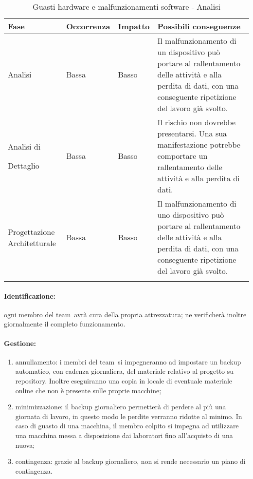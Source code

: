 \documentclass[../PianoProgetto.tex]{subfiles}
\begin{document}
	\begin{table}[h]
		\centering
		\begin{tabularx}{\textwidth}{F O O P}
			\toprule
			\textbf{Fase} & \textbf{Occorrenza} & \textbf{Impatto} & \textbf{Possibili conseguenze}\\
			\midrule
			Analisi & Bassa & Basso & Il malfunzionamento di un dispositivo può portare al rallentamento delle attività e alla perdita di dati, con una conseguente ripetizione del lavoro già svolto. \\
			\midrule
			Analisi di \par Dettaglio & Bassa & Basso & Il rischio non dovrebbe presentarsi. Una sua manifestazione potrebbe comportare un rallentamento delle attività e alla perdita di dati. \\
			\midrule
			Progettazione Architetturale & Bassa & Basso & Il malfunzionamento di uno dispositivo può portare al rallentamento delle attività e alla perdita di dati, con una conseguente ripetizione del lavoro già svolto. \\
			\bottomrule
		\end{tabularx}
		\caption{Guasti hardware e malfunzionamenti software - Analisi}
		\label{tab:Guasti hardware e malfunzionamenti software - Analisi}	
	\end{table} 
		
	\paragraph*{Identificazione:} ogni membro del team\g\ avrà cura della propria attrezzatura; ne verificherà inoltre giornalmente il completo funzionamento.
	
	\paragraph*{Gestione:}
	\begin{enumerate}
		\item annullamento: i membri del team\g\ si impegneranno ad impostare un backup automatico, con cadenza giornaliera, del materiale relativo al progetto su repository\g . Inoltre eseguiranno una copia in locale di eventuale materiale online che non è presente sulle proprie macchine;
		\item minimizzazione: il backup giornaliero permetterà di perdere al più una giornata di lavoro, in questo modo le perdite verranno ridotte al minimo. In caso di guasto di una macchina, il membro colpito si impegna ad utilizzare una macchina messa a disposizione dai laboratori fino all'acquisto di una nuova;
		\item contingenza: grazie al backup giornaliero, non si rende necessario un piano di contingenza.
	\end{enumerate} 	
	
\end{document}
